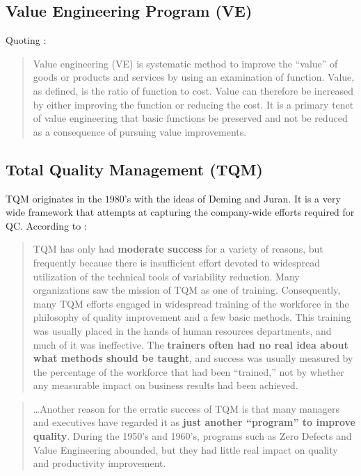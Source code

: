 \subsection{Value Engineering Program (VE)}
Quoting \cite{wikipedia_value_2015}:
\begin{quote}
Value engineering (VE) is systematic method to improve the ``value'' of goods or products and services by using an examination of function. Value, as defined, is the ratio of function to cost. Value can therefore be increased by either improving the function or reducing the cost. It is a primary tenet of value engineering that basic functions be preserved and not be reduced as a consequence of pursuing value improvements.

\end{quote}

\subsection{Total Quality Management (TQM)}
TQM originates in the $1980$'s with the ideas of Deming and Juran.
It is a very wide framework that attempts at capturing the company-wide efforts required for QC. 
According to \citet[p.23]{montgomery_introduction_2007}:
\begin{quote}
TQM has only had \textbf{moderate success} for a variety of reasons, but frequently because there is insufficient effort devoted to widespread utilization of the technical tools of variability reduction. Many organizations saw the mission of TQM as one of training. Consequently, many TQM efforts engaged in widespread training of the workforce in the philosophy of quality improvement and a few basic methods.
This training was usually placed in the hands of human resources departments, and much of it was ineffective. The \textbf{trainers often had no real idea about what methods should be taught}, and success was usually measured by the percentage of the workforce that had been ``trained,'' not by whether any measurable impact on business results had been achieved.
\end{quote}

\begin{quote}
\dots Another reason for the erratic success of TQM is that many managers and executives
have regarded it as \textbf{just another “program” to improve quality}. During the 1950's and 1960's, programs such as Zero Defects and Value Engineering abounded, but they had little real impact on quality and productivity improvement.
\end{quote}



